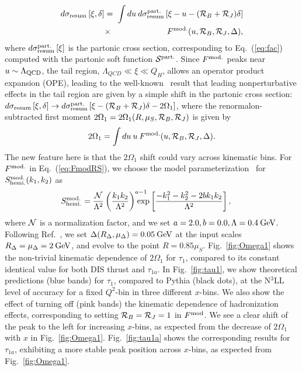 \documentclass[prd,aps,nofootinbib,twocolumn,showpacs,amsmath,superscriptaddress]{revtex4-2}
\newcommand{\nn}{\nonumber}
\newcommand{\bea}{\begin{eqnarray}}
\newcommand{\eea}{\end{eqnarray}}
\begin{document}
\bea
\label{eq:fac_intermediate_1}
d\sigma_{\rm resum}  \left [ \xi, \delta \right]
&=& \hspace{-1.5mm} \int du \>d\sigma_{\rm resum}^{\rm part.} \left [\xi- u - ({\cal R}_B +{\cal R}_J) \delta\right ] \nn \\
&\times& F^{\rm mod.}(u, {\cal R}_B,{\cal R}_J,\Delta) ,
\eea
where $d\sigma_{\rm resum}^{\rm part.}\left [\xi \right ]$ is the partonic cross section, corresponding to Eq.~(\ref{eq:fac}) computed with the partonic soft function ${\cal S}^{\rm part.}$.
Since $F^{\rm mod.}$ peaks near $u\sim \Lambda_{\rm QCD}$, the tail region,  $\Lambda_{QCD} \ll \xi \ll Q_H$, allows an operator product expansion (OPE), leading to the well-known~\cite{Korchemsky:1994is,Dokshitzer:1995zt,Dokshitzer:1995qm} result that leading nonperturbative effects in the tail region are given by a simple shift in the partonic cross section:  $d\sigma_{\rm resum}\left [\xi, \delta\right ]  \to d\sigma_{\rm resum}^{\rm part.}\left [\xi -({\cal R}_B+{\cal R}_J)\delta- 2 \Omega_1\right ]$,
where the renormalon-subtracted first moment $2\Omega_1=2\Omega_1(R,\mu_S,{\cal R}_B,{\cal R}_J) $ is given by
\bea
\label{eq:moment}
2\Omega_1 = \int du \>u\> F^{\rm mod.}(u, {\cal R}_B,{\cal R}_J,\Delta) .
\eea
The new feature here is that  the $2\Omega_1$  shift could vary across kinematic bins. 
For $F^{\rm mod.}$ in Eq.~(\ref{eq:FmodRS}), we choose the model parameterization~\cite{Korchemsky:2000kp} for $S^{\rm mod.}_{\rm hemi.}(k_1,k_2)$ as
\bea
\label{eq:shapehemi}
\hspace{-0.5cm}S^{\rm mod.}_{\rm hemi.} = \frac{{\cal N}}{\Lambda^2}\left ( \frac{k_1 k_2}{\Lambda^2}\right )^{a-1} \hspace{-0.5cm}{\rm exp}\left [\frac{-k_1^2 -k_2^2 - 2b k_1 k_2}{\Lambda^2} \right ], 
\eea
where ${\cal N}$ is a normalization factor, and we set $a=2.0,  b=0.0, \Lambda= 0.4 \>{\rm GeV}$. Following  Ref.~\cite{Ee:2025scz}, we set  $\Delta(R_\Delta,\mu_\Delta)=0.05\> {\rm GeV}$ at the input scales $ R_\Delta=\mu_\Delta=2 \>{\rm GeV}$, and evolve to the point $R=0.85 \mu_S$. Fig.~\ref{fig:Omega1} shows the non-trivial kinematic dependence of $2\Omega_1$ for $\tau_1$, compared to its constant identical value for both DIS thrust and $\tau_{1a}$. In Fig.~\ref{fig:tau1}, we show theoretical predictions (blue bands) for $\tau_1$, compared to Pythia (black dots), at the N$^3$LL level of accuracy for a fixed $Q^2$-bin in three different $x$-bins.  We also show the effect of turning off (pink bands) the kinematic dependence of hadronization effects, corresponding to setting ${\cal R}_B={\cal R}_J=1$ in $F^{\rm mod}$. We see a clear shift of the peak  to the left  for increasing $x$-bins, as expected from the decrease of  $2\Omega_1$ with $x$ in Fig.~\ref{fig:Omega1}. Fig.~\ref{fig:tau1a} shows the corresponding results for $\tau_{1a}$, 
exhibiting a more stable peak position across $x$-bins, as expected from Fig.~\ref{fig:Omega1}.  
\end{document}
